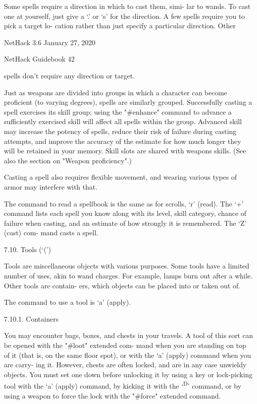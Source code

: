 \documentclass[11pt]{article}
\begin{document}
   Some spells require a direction in which to cast them, simi-
lar to wands.  To cast one at yourself, just give a `.' or `s'
for the direction. A few spells require you to pick a target lo-
cation rather than just specify a particular direction. Other


NetHack 3.6                   January 27, 2020





NetHack Guidebook                       42



spells don't require any direction or target.

   Just as weapons are divided into groups in which a character
can become proficient (to varying degrees), spells are similarly
grouped. Successfully casting a spell exercises its skill group;
using the "\#enhance" command to advance a sufficiently exercised
skill will affect all spells within the group.  Advanced skill
may increase the potency of spells, reduce their risk of failure
during casting attempts, and improve the accuracy of the estimate
for how much longer they will be retained in your memory. Skill
slots are shared with weapons skills. (See also the section on
"Weapon proficiency".)

   Casting a spell also requires flexible movement, and wearing
various types of armor may interfere with that.

   The command to read a spellbook is the same as for scrolls,
`r' (read). The `+' command lists each spell you know along with
its level, skill category, chance of failure when casting, and an
estimate of how strongly it is remembered. The `Z' (cast) com-
mand casts a spell.

7.10. Tools (`(')

   Tools are miscellaneous objects with various purposes. Some
tools have a limited number of uses, akin to wand charges. For
example, lamps burn out after a while. Other tools are contain-
ers, which objects can be placed into or taken out of.

The command to use a tool is `a' (apply).

7.10.1. Containers

   You may encounter bags, boxes, and chests in your travels.
A tool of this sort can be opened with the "\#loot" extended com-
mand when you are standing on top of it (that is, on the same
floor spot), or with the `a' (apply) command when you are carry-
ing it.  However, chests are often locked, and are in any case
unwieldy objects. You must set one down before unlocking it by
using a key or lock-picking tool with the `a' (apply) command, by
kicking it with the `\textsuperscript{D}' command, or by using a weapon to force
the lock with the "\#force" extended command.
\end{document}
